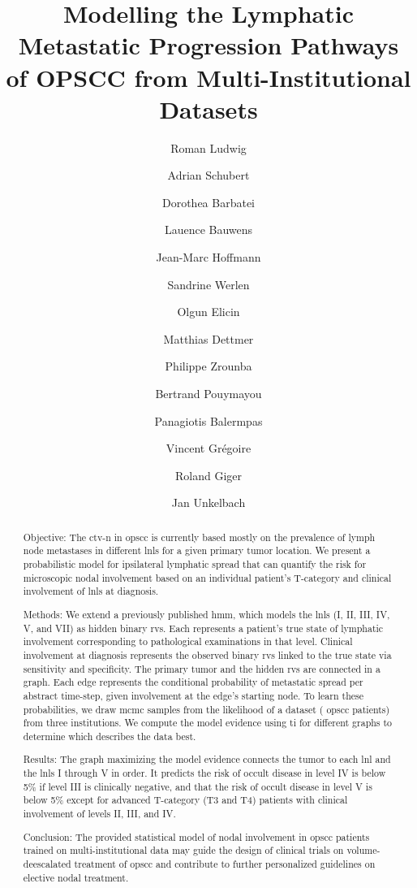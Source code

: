\documentclass[twocolumn]{aastex631}
\begin{document}
\title{Modelling the Lymphatic Metastatic Progression Pathways of OPSCC from Multi-Institutional Datasets}


\author{Roman Ludwig}
\author{Adrian Schubert}
\author{Dorothea Barbatei}
\author{Lauence Bauwens}
\author{Jean-Marc Hoffmann}
\author{Sandrine Werlen}
\author{Olgun Elicin}
\author{Matthias Dettmer}
\author{Philippe Zrounba}
\author{Bertrand Pouymayou}
\author{Panagiotis Balermpas}
\author{Vincent Grégoire}
\author{Roland Giger}
\author{Jan Unkelbach}

\begin{abstract}
    Objective: The \gls{ctv-n} in \gls{opscc} is currently based mostly on the prevalence of lymph node metastases in different \glspl{lnl} for a given primary tumor location. We present a probabilistic model for ipsilateral lymphatic spread that can quantify the risk for microscopic nodal involvement based on an individual patient's T-category and clinical involvement of \glspl{lnl} at diagnosis.

    Methods: We extend a previously published \gls{hmm}, which models the \glspl{lnl} (I, II, III, IV, V, and VII) as hidden binary \glspl{rv}. Each represents a patient's true state of lymphatic involvement corresponding to pathological examinations in that level. Clinical involvement at diagnosis represents the observed binary \glspl{rv} linked to the true state via sensitivity and specificity. The primary tumor and the hidden \glspl{rv} are connected in a graph. Each edge represents the conditional probability of metastatic spread per abstract time-step, given involvement at the edge's starting node. To learn these probabilities, we draw \acrlong{mcmc} samples from the likelihood of a dataset ( \gls{opscc} patients) from three institutions. We compute the model evidence using \acrlong{ti} for different graphs to determine which describes the data best.

    Results: The graph maximizing the model evidence connects the tumor to each \gls{lnl} and the \glspl{lnl} I through V in order. It predicts the risk of occult disease in level IV is below 5\% if level III is clinically negative, and that the risk of occult disease in level V is below 5\% except for advanced T-category (T3 and T4) patients with clinical involvement of levels II, III, and IV.

    Conclusion: The provided statistical model of nodal involvement in \gls{opscc} patients trained on multi-institutional data may guide the design of clinical trials on volume-deescalated treatment of \gls{opscc} and contribute to further personalized guidelines on elective nodal treatment.
\end{abstract}
\end{document}
